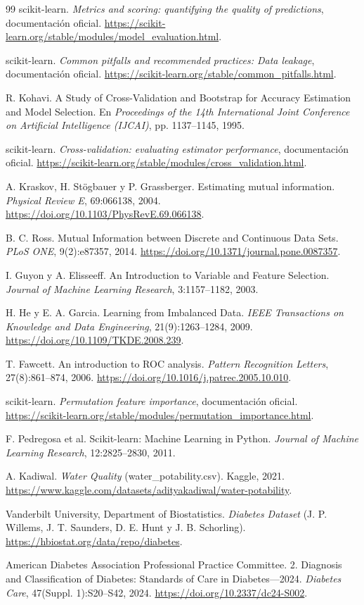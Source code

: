 \documentclass[11pt]{article}
\begin{document}
\begin{thebibliography}{99}
scikit-learn. \emph{Metrics and scoring: quantifying the quality of predictions},
documentación oficial.
\url{https://scikit-learn.org/stable/modules/model_evaluation.html}.

scikit-learn. \emph{Common pitfalls and recommended practices: Data leakage},
documentación oficial.
\url{https://scikit-learn.org/stable/common_pitfalls.html}.

R. Kohavi. A Study of Cross-Validation and Bootstrap for Accuracy Estimation and
Model Selection. En \emph{Proceedings of the 14th International Joint Conference on
Artificial Intelligence (IJCAI)}, pp. 1137--1145, 1995.

scikit-learn. \emph{Cross-validation: evaluating estimator performance},
documentación oficial.
\url{https://scikit-learn.org/stable/modules/cross_validation.html}.

A. Kraskov, H. Stögbauer y P. Grassberger. Estimating mutual information.
\emph{Physical Review E}, 69:066138, 2004.
\url{https://doi.org/10.1103/PhysRevE.69.066138}.

B. C. Ross. Mutual Information between Discrete and Continuous Data Sets.
\emph{PLoS ONE}, 9(2):e87357, 2014.
\url{https://doi.org/10.1371/journal.pone.0087357}.

I. Guyon y A. Elisseeff. An Introduction to Variable and Feature Selection.
\emph{Journal of Machine Learning Research}, 3:1157--1182, 2003.

H. He y E. A. Garcia. Learning from Imbalanced Data. \emph{IEEE Transactions on
Knowledge and Data Engineering}, 21(9):1263--1284, 2009.
\url{https://doi.org/10.1109/TKDE.2008.239}.

T. Fawcett. An introduction to ROC analysis. \emph{Pattern Recognition Letters},
27(8):861--874, 2006. \url{https://doi.org/10.1016/j.patrec.2005.10.010}.

scikit-learn. \emph{Permutation feature importance}, documentación oficial.
\url{https://scikit-learn.org/stable/modules/permutation_importance.html}.

F. Pedregosa et al. Scikit-learn: Machine Learning in Python. \emph{Journal of
Machine Learning Research}, 12:2825--2830, 2011.

A. Kadiwal. \emph{Water Quality} (water\_potability.csv). Kaggle, 2021.
\url{https://www.kaggle.com/datasets/adityakadiwal/water-potability}.

Vanderbilt University, Department of Biostatistics. \emph{Diabetes Dataset}
(J. P. Willems, J. T. Saunders, D. E. Hunt y J. B. Schorling).
\url{https://hbiostat.org/data/repo/diabetes}.

American Diabetes Association Professional Practice Committee. 2. Diagnosis and
Classification of Diabetes: Standards of Care in Diabetes---2024. \emph{Diabetes
Care}, 47(Suppl. 1):S20--S42, 2024. \url{https://doi.org/10.2337/dc24-S002}.
\end{thebibliography}
\end{document}
